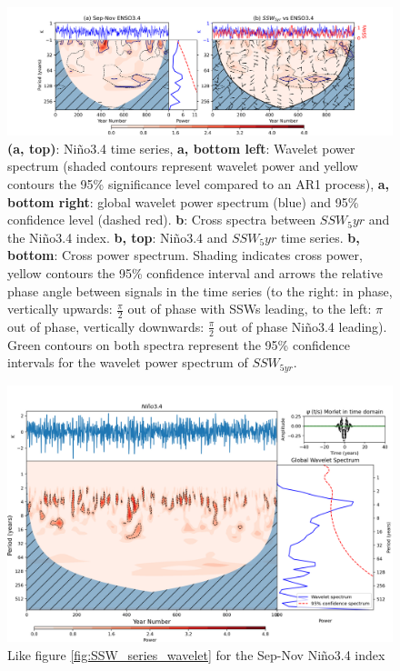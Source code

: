 \begin{figure}[h!]
\begin{center}
\noindent\includegraphics[width = \linewidth]{Figures/Figures-origins/ENSO_wavelet_combined.png}
\caption{\textbf{(a, top)}: Ni\~{n}o3.4 time series, \textbf{a, bottom left}: Wavelet power spectrum (shaded contours represent wavelet power and yellow contours the 95\% significance level compared to an AR1 process), \textbf{a, bottom right}: global wavelet power spectrum (blue) and 95\% confidence level (dashed red). \textbf{b}: Cross spectra between $SSW_5yr$ and the Ni\~{n}o3.4 index. \textbf{b, top}: Ni\~{n}o3.4 and $SSW_5yr$ time series. \textbf{b, bottom}: Cross power spectrum. Shading indicates cross power, yellow contours the 95\% confidence interval and arrows the relative phase angle between signals in the time series (to the right: in phase, vertically upwards: $\frac{\pi}{2}$ out of phase with SSWs leading, to the left: $\pi$ out of phase, vertically downwards: $\frac{\pi}{2}$ out of phase Ni\~{n}o3.4 leading). Green contours on both spectra represent the 95\% confidence intervals for the wavelet power spectrum of $SSW_{5yr}$.}
\label{fig:ENSO_wavelet}
\end{center}
\end{figure}

\begin{figure}[h!]
\begin{center}
\noindent\includegraphics[width = 0.8\linewidth]{Figures/Figures-origins/ENSO_wavelet_unsmoothed.png}
\caption{Like figure \ref{fig:SSW_series_wavelet} for the Sep-Nov  Ni\~{n}o3.4 index} 
\label{fig:ENSO_unsmoothed_wavelet}
\end{center}
\end{figure}

